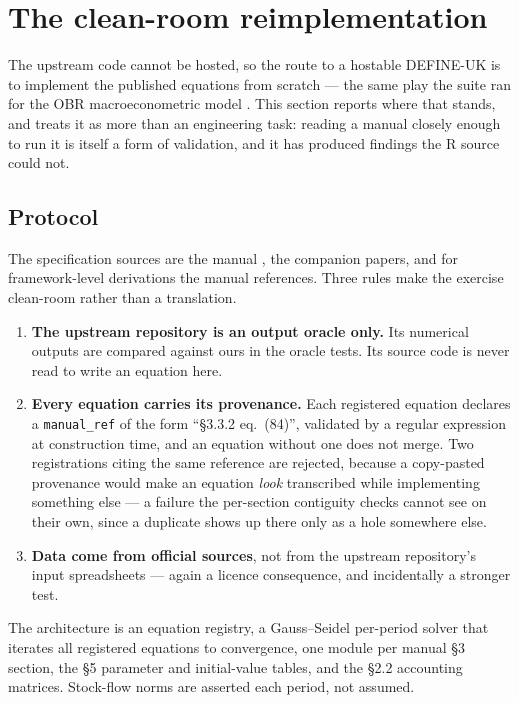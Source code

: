 \section{The clean-room reimplementation}
\label{sec:reimplementation}

The upstream code cannot be hosted, so the route to a hostable DEFINE-UK is to implement the published equations from scratch --- the same play the suite ran for the OBR macroeconometric model \citep{ahmadi2026obr}. This section reports where that stands, and treats it as more than an engineering task: reading a manual closely enough to run it is itself a form of validation, and it has produced findings the R source could not.

\subsection{Protocol}

The specification sources are the manual \citep{georgedafermos2026manual}, the companion papers, and \citet{dafermos2017} for framework-level derivations the manual references. Three rules make the exercise clean-room rather than a translation.

\begin{enumerate}
\item \textbf{The upstream repository is an output oracle only.} Its numerical outputs are compared against ours in the oracle tests. Its source code is never read to write an equation here.
\item \textbf{Every equation carries its provenance.} Each registered equation declares a \texttt{manual\_ref} of the form ``\S3.3.2 eq.\ (84)'', validated by a regular expression at construction time, and an equation without one does not merge. Two registrations citing the same reference are rejected, because a copy-pasted provenance would make an equation \emph{look} transcribed while implementing something else --- a failure the per-section contiguity checks cannot see on their own, since a duplicate shows up there only as a hole somewhere else.
\item \textbf{Data come from official sources}, not from the upstream repository's input spreadsheets --- again a licence consequence, and incidentally a stronger test.
\end{enumerate}

The architecture is an equation registry, a Gauss--Seidel per-period solver that iterates all registered equations to convergence, one module per manual \S3 section, the \S5 parameter and initial-value tables, and the \S2.2 accounting matrices. Stock-flow norms are asserted each period, not assumed.

